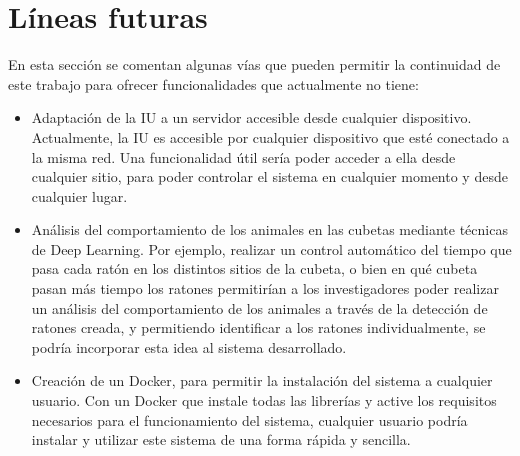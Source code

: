 \section{Líneas futuras}
En esta sección se comentan algunas vías que pueden permitir la continuidad de este trabajo para ofrecer funcionalidades que actualmente no tiene:
\begin{itemize}
\item Adaptación de la IU a un servidor accesible desde cualquier dispositivo. Actualmente, la IU es accesible por cualquier dispositivo que esté conectado a la misma red. Una funcionalidad útil sería poder acceder a ella desde cualquier sitio, para poder controlar el sistema en cualquier momento y desde cualquier lugar.
\item Análisis del comportamiento de los animales en las cubetas mediante técnicas de Deep Learning. Por ejemplo, realizar un control automático del tiempo que pasa cada ratón en los distintos sitios de la cubeta, o bien en qué cubeta pasan más tiempo los ratones permitirían a los investigadores poder realizar un análisis del comportamiento de los animales a través de la detección de ratones creada, y permitiendo identificar a los ratones individualmente, se podría incorporar esta idea al sistema desarrollado.
\item Creación de un Docker, para permitir la instalación del sistema a cualquier usuario. Con un Docker que instale todas las librerías y active los requisitos necesarios para el funcionamiento del sistema, cualquier usuario podría instalar y utilizar este sistema de una forma rápida y sencilla.
\end{itemize}



